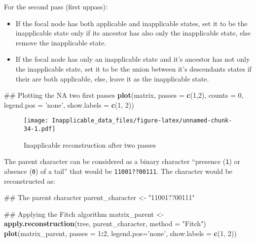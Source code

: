 \documentclass[]{book}
\newenvironment{Shaded}{\begin{snugshade}}{\end{snugshade}}
\newcommand{\KeywordTok}[1]{\textcolor[rgb]{0.13,0.29,0.53}{\textbf{#1}}}
\newcommand{\DataTypeTok}[1]{\textcolor[rgb]{0.13,0.29,0.53}{#1}}
\newcommand{\DecValTok}[1]{\textcolor[rgb]{0.00,0.00,0.81}{#1}}
\newcommand{\StringTok}[1]{\textcolor[rgb]{0.31,0.60,0.02}{#1}}
\newcommand{\OperatorTok}[1]{\textcolor[rgb]{0.81,0.36,0.00}{\textbf{#1}}}
\newcommand{\NormalTok}[1]{#1}
\providecommand{\tightlist}{%
  \setlength{\itemsep}{0pt}\setlength{\parskip}{0pt}}
\theoremstyle{definition}
\theoremstyle{definition}
\theoremstyle{definition}
\theoremstyle{remark}
\begin{document}
For the second pass (first uppass):

\begin{itemize}
\tightlist
\item
  If the focal node has both applicable and inapplicable states, set it
  to be the inapplicable state only if its ancestor has also only the
  inapplicable state, else remove the inapplicable state.
\item
  If the focal node has only an inapplicable state and it's ancestor has
  not only the inapplicable state, set it to be the union between it's
  descendants states if their are both applicable, else, leave it as the
  inapplicable state.
\end{itemize}

\begin{Shaded}
\begin{Highlighting}[]
\NormalTok{## Plotting the NA two first passes}
\KeywordTok{plot}\NormalTok{(matrix, }\DataTypeTok{passes =} \KeywordTok{c}\NormalTok{(}\DecValTok{1}\NormalTok{,}\DecValTok{2}\NormalTok{), }\DataTypeTok{counts =} \DecValTok{0}\NormalTok{, }
     \DataTypeTok{legend.pos =} \StringTok{'none'}\NormalTok{, }\DataTypeTok{show.labels =} \KeywordTok{c}\NormalTok{(}\DecValTok{1}\NormalTok{, }\DecValTok{2}\NormalTok{))}
\end{Highlighting}
\end{Shaded}

\begin{figure}
\centering
\texttt{[image: Inapplicable\_data\_files/figure-latex/unnamed-chunk-34-1.pdf]}
\caption{\label{fig:unnamed-chunk-34}Inapplicable reconstruction after two
passes}
\end{figure}

The parent character can be considered as a binary character ``presence
(\texttt{1}) or absence (\texttt{0}) of a tail'' that would be
\texttt{11001??00111}. The character would be reconstructed as:

\begin{Shaded}
\begin{Highlighting}[]
\NormalTok{## The parent character}
\NormalTok{parent_character <-}\StringTok{ "11001??00111"}

\NormalTok{## Applying the Fitch algorithm}
\NormalTok{matrix_parent <-}\StringTok{ }\KeywordTok{apply.reconstruction}\NormalTok{(tree, parent_character, }\DataTypeTok{method =} \StringTok{"Fitch"}\NormalTok{)}
\KeywordTok{plot}\NormalTok{(matrix_parent, }\DataTypeTok{passes =} \DecValTok{1}\OperatorTok{:}\DecValTok{2}\NormalTok{, }\DataTypeTok{legend.pos=}\StringTok{'none'}\NormalTok{, }\DataTypeTok{show.labels =} \KeywordTok{c}\NormalTok{(}\DecValTok{1}\NormalTok{, }\DecValTok{2}\NormalTok{))}
\end{Highlighting}
\end{Shaded}
\end{document}

